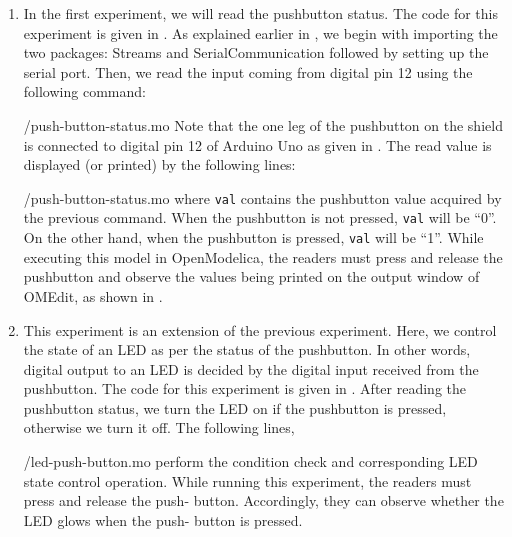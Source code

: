 \begin{enumerate}
\item In the first experiment, we will read the pushbutton status. The code for this experiment is given in
  . As explained earlier in , 
  we begin with importing the two packages: Streams and SerialCommunication followed 
  by setting up the serial port. Then, we read the input coming
 from digital pin 12 using the following command: 
 
  {\LocPushOpenModelicacode/push-button-status.mo}
  Note that the one leg of the pushbutton on the shield is connected to digital
pin 12 of Arduino Uno as given in . The read value is displayed (or
printed) by the following lines:

  {\LocPushOpenModelicacode/push-button-status.mo} where {\tt val} contains the pushbutton value acquired by the previous command.
  When the pushbutton is not pressed, {\tt val} will be ``0''. On the other hand,
  when the pushbutton is pressed, {\tt val} will be ``1''. While executing this model in OpenModelica, 
the readers must press and release the pushbutton and observe the values being printed
on the output window of OMEdit, as shown in .
\item This experiment is an extension of the previous
  experiment. Here, we control the state of an LED as per the status
  of the pushbutton. In other words, digital output to an LED is
  decided by the digital input received from the pushbutton. The code
  for this experiment is given in . 
  After reading the pushbutton status, we turn the LED on if the pushbutton is
  pressed, otherwise we turn it off. The following lines, 
  
  {\LocPushOpenModelicacode/led-push-button.mo} perform the condition check
  and corresponding LED state control operation. While running this experiment, the readers must press and release the push-
  button. Accordingly, they can observe whether the LED glows when the push-
  button is pressed.
\end{enumerate}



